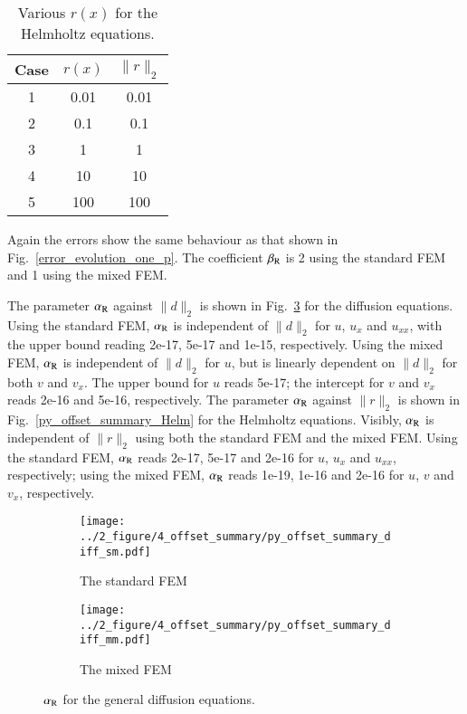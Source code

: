 \documentclass[review,3p]{elsarticle}
\begin{document}
\begin{table}[!ht]
\centering
\caption [w]{Various $r(x)$ for the Helmholtz equations.} 
\label{r_Helmholtz_equations}
 \begin{tabular}{c c c} \hline
Case & $r(x)$ & $\|r\|_2$ \\ \hline
1 & 0.01 & 0.01 \\ \hline
2 & 0.1 & 0.1 \\ \hline 
3 & 1 & 1 \\ \hline 
4 & 10 & 10 \\ \hline 
5 & 100 & 100 \\ \hline
\end{tabular}
\end{table}

Again the errors show the same behaviour as that shown in Fig.~\ref{error_evolution_one_p}. The coefficient $\beta_{\rm R}$ is 2 using the standard FEM and 1 using the mixed FEM. 

The parameter $\alpha_{\rm R}$ against $\|d\|_2$ is shown in Fig.~\ref{py_offset_summary_diff} for the diffusion equations. Using the standard FEM, $\alpha_{\rm R}$ is independent of $\|d\|_2$ for $u$, $u_x$ and $u_{xx}$, with the upper bound reading 2e-17, 5e-17 and 1e-15, respectively. Using the mixed FEM, $\alpha_{\rm R}$ is independent of $\|d\|_2$ for $u$, but is linearly dependent on $\|d\|_2$ for both $v$ and $v_x$. The upper bound for $u$ reads 5e-17; the intercept for $v$ and $v_x$ reads 2e-16 and 5e-16, respectively.
The parameter $\alpha_{\rm R}$ against $\|r\|_2$ is shown in Fig.~\ref{py_offset_summary_Helm} for the Helmholtz equations.
Visibly, $\alpha_{\rm R}$ is independent of $\|r\|_2$ using both the standard FEM and the mixed FEM. Using the standard FEM, $\alpha_{\rm R}$ reads 2e-17, 5e-17 and 2e-16 for $u$, $u_x$ and $u_{xx}$, respectively; using the mixed FEM, $\alpha_{\rm R}$ reads 1e-19, 1e-16 and 2e-16 for $u$, $v$ and $v_x$, respectively.


\begin{figure}[!ht]
	\centering
    \begin{subfigure}{6.0cm}
        \texttt{[image: ../2\_figure/4\_offset\_summary/py\_offset\_summary\_diff\_sm.pdf]}
        \caption{The standard FEM}
        \label{py_offset_summary_diff_sm}
    \end{subfigure}
    \hspace{-0.2cm}
    \begin{subfigure}{6.0cm}
        \texttt{[image: ../2\_figure/4\_offset\_summary/py\_offset\_summary\_diff\_mm.pdf]}
        \caption{The mixed FEM}
        \label{py_offset_summary_diff_mm}
    \end{subfigure}
\caption{$\alpha_{\rm R}$ for the general diffusion equations.}
\label{py_offset_summary_diff}
\end{figure}
\end{document}

